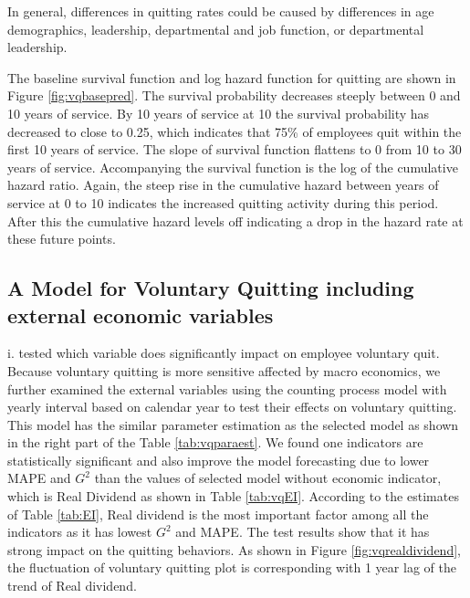 \documentclass[12pt,letterpaper]{article}
\begin{document}
In general, differences in quitting rates could be caused by differences in age demographics, leadership, departmental and job function, or departmental leadership.

The baseline survival function and log hazard function for quitting are shown in Figure \ref{fig:vqbasepred}. The survival probability decreases steeply between 0 and 10 years of service. By 10 years of service at 10 the survival probability has decreased to close to 0.25, which indicates that 75\% of employees quit within the first 10 years of service.  The slope of survival function flattens to 0 from 10 to 30 years of service.  Accompanying the survival function is the log of the cumulative hazard ratio.  Again, the steep rise in the cumulative hazard between years of service at 0 to 10 indicates the increased quitting activity during this period.  After this the cumulative hazard levels off indicating a drop in the hazard rate at these future points.


\subsection{A Model for Voluntary Quitting including external economic variables}
i. tested which variable does significantly impact on employee voluntary quit.
Because voluntary quitting is more sensitive affected by macro economics, we further examined the external variables using the counting process model with yearly interval based on calendar year to test their effects on voluntary quitting. This model has the similar parameter estimation as the selected model as shown in the right part of the Table \ref{tab:vqparaest}. We found one indicators are statistically significant and also improve the model forecasting due to lower MAPE and $G^2$ than the values of selected model without economic indicator, which is Real Dividend as shown in Table \ref{tab:vqEI}. According to the estimates of Table \ref{tab:EI}, Real dividend is the most important factor among all the indicators as it has lowest $G^2$ and MAPE. The test results show that it has strong impact on the quitting behaviors. As shown in Figure \ref{fig:vqrealdividend}, the fluctuation of voluntary quitting plot is corresponding with 1 year lag of the trend of Real dividend.
\end{document}
